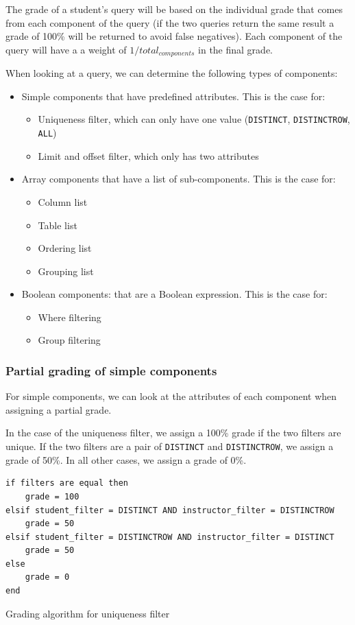 The grade of a student's query will be based on the individual grade that comes from each component of the query (if the two queries return the same result a grade of 100\% will be returned to avoid false negatives). Each component of the query will have a a weight of $1 / total_{components}$  in the final grade.

When looking at a query, we can determine the following types of components:

\begin{itemize}
    \item Simple components that have predefined attributes. This is the case for:
        \begin{itemize}
            \item Uniqueness filter, which can only have one value (\texttt{DISTINCT}, \texttt{DISTINCTROW}, \texttt{ALL})
            \item Limit and offset filter, which only has two attributes
        \end{itemize}
    \item Array components that have a list of sub-components. This is the case for:
        \begin{itemize}
            \item Column list
            \item Table list
            \item Ordering list
            \item Grouping list
        \end{itemize}
    \item Boolean components: that are a Boolean expression. This is the case for:
        \begin{itemize}
            \item Where filtering
            \item Group filtering
        \end{itemize}
\end{itemize}

\subsubsection{Partial grading of simple components}

For simple components, we can look at the attributes of each component when assigning a partial grade.

In the case of the uniqueness filter, we assign a 100\% grade if the two filters are unique. If the two filters are a pair of \texttt{DISTINCT} and \texttt{DISTINCTROW}, we assign a grade of 50\%. In all other cases, we assign a grade of 0\%.
\begin{code}
\begin{verbatim}
if filters are equal then
    grade = 100
elsif student_filter = DISTINCT AND instructor_filter = DISTINCTROW
    grade = 50
elsif student_filter = DISTINCTROW AND instructor_filter = DISTINCT
    grade = 50
else
    grade = 0
end
\end{verbatim}
\caption{Grading algorithm for uniqueness filter}
\end{code}

